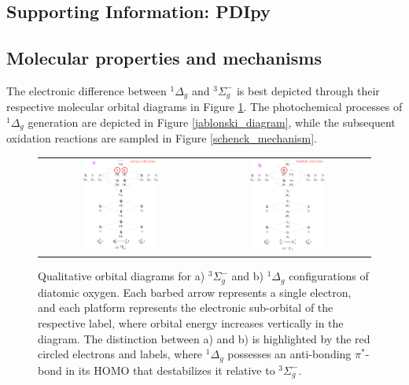 \subsection{Supporting Information: PDIpy}

\subsection{Molecular properties and mechanisms}
The electronic difference between $^1\Delta_g$ and $^3\Sigma_g^-$ is best depicted through their respective molecular orbital diagrams in Figure \ref{mo_diagrams}. The photochemical processes of $^1\Delta_g$ generation are depicted in Figure \ref{jablonski_diagram}, while the subsequent oxidation reactions are sampled in Figure \ref{schenck_mechanism}.

\begin{figure}
    \centering
    \begin{tabular}{c|c}
        \includegraphics[width = 0.48\textwidth]{images/PDIpy/background/triplet_mo_diagram.png}
        & \includegraphics[width = 0.48\textwidth]{images/PDIpy/background/singlet_mo_diagram.png}
    \end{tabular}
    \caption{
        Qualitative orbital diagrams for a) $^3\Sigma_g^-$ and b) $^1\Delta_g$ configurations of diatomic oxygen. Each barbed arrow represents a single electron, and each platform represents the electronic sub-orbital of the respective label, where orbital energy increases vertically in the diagram. The distinction between a) and b) is highlighted by the red circled electrons and labels, where $^1\Delta_g$ possesses an anti-bonding $\pi^*$-bond in its HOMO that destabilizes it relative to $^3\Sigma_g^-$.
    }
    \label{mo_diagrams}
\end{figure}

